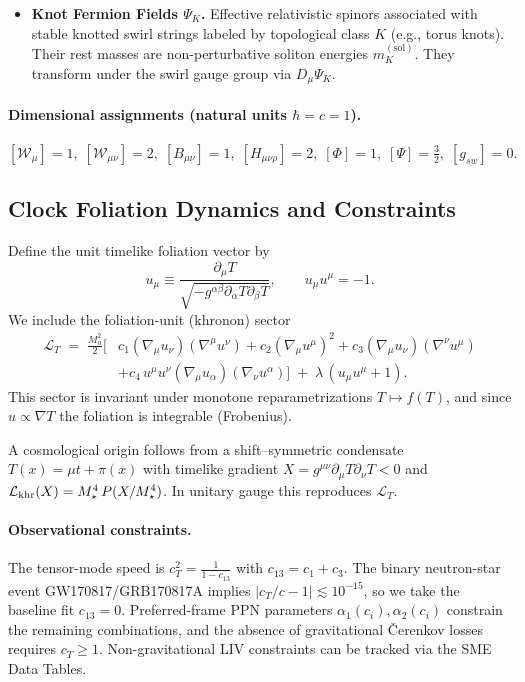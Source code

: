 \documentclass[11pt, preprint,titlepage]{revtex4-2}
\begin{document}
\begin{itemize}
		\item \textbf{Knot Fermion Fields \(\Psi_K\).}
		Effective relativistic spinors associated with stable knotted swirl strings labeled by topological class \(K\) (e.g., torus knots). Their rest masses are non-perturbative soliton energies \(m_K^{(\mathrm{sol})}\). They transform under the swirl gauge group via \(D_\mu\Psi_K\).

	\end{itemize}

	\paragraph{Dimensional assignments (natural units \(\hbar=c=1\)).}
	\([ \mathcal{W}_\mu ]=1,\; [ \mathcal{W}_{\mu\nu} ]=2,\; [ B_{\mu\nu} ]=1,\; [ H_{\mu\nu\rho} ]=2,\; [ \Phi ]=1,\; [ \Psi ]=\tfrac{3}{2},\; [g_{\!sw}]=0.\)

	\subsection{Clock Foliation Dynamics and Constraints}
	Define the unit timelike foliation vector by
	\begin{equation}
		u_\mu \equiv \frac{\partial_\mu T}{\sqrt{-g^{\alpha\beta}\partial_\alpha T\partial_\beta T}},\qquad u_\mu u^\mu=-1.
	\end{equation}
	We include the foliation-unit (khronon) sector
	\begin{align}
		\mathcal L_{T} \;=\; \frac{M_u^{2}}{2}\Big[&c_1(\nabla_\mu u_\nu)(\nabla^\mu u^\nu)+c_2(\nabla_\mu u^\mu)^2+c_3(\nabla_\mu u_\nu)(\nabla^\nu u^\mu)\\
		&+c_4\,u^\mu u^\nu (\nabla_\mu u_\alpha)(\nabla_\nu u^\alpha)\Big]
		\;+\;\lambda\,(u_\mu u^\mu+1).\nonumber
	\end{align}
	This sector is invariant under monotone reparametrizations \(T\mapsto f(T)\), and since \(u\propto\nabla T\) the foliation is integrable (Frobenius).

	A cosmological origin follows from a shift--symmetric condensate \(T(x)=\mu t+\pi(x)\) with timelike gradient \(X=g^{\mu\nu}\partial_\mu T\partial_\nu T<0\) and
	\(\mathcal L_{\rm khr}(X)=M_\star^4\,P(X/M_\star^4)\). In unitary gauge this reproduces \(\mathcal L_T\).

	\paragraph{Observational constraints.}
	The tensor-mode speed is
	\(c_T^2=\frac{1}{1-c_{13}}\) with \(c_{13}=c_1+c_3\). The binary neutron-star event GW170817/GRB170817A implies \(|c_T/c-1|\lesssim10^{-15}\), so we take the baseline fit \(c_{13}=0\).
	Preferred-frame PPN parameters \(\alpha_1(c_i),\alpha_2(c_i)\) constrain the remaining combinations, and the absence of gravitational \v{C}erenkov losses requires \(c_T\ge 1\).
	Non-gravitational LIV constraints can be tracked via the SME Data Tables.
\end{document}
